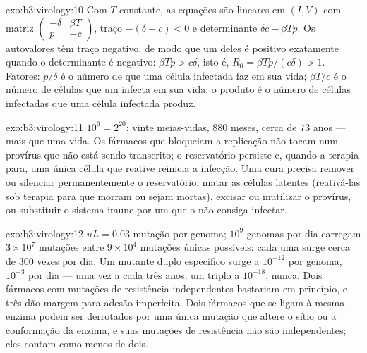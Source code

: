 \begin{solution}{exo:b3:virology:10}
Com $T$ constante, as equações são lineares em $(I, V)$ com matriz
$\begin{pmatrix} -\delta & \beta T \\ p & -c \end{pmatrix}$, traço
$-(\delta + c) < 0$ e determinante $\delta c - \beta Tp$. Os autovalores
têm traço negativo, de modo que um deles é positivo exatamente quando o
determinante é negativo: $\beta Tp > c\delta$, isto é,
$R_{0} = \beta
Tp/(c\delta) > 1$. Fatores: $p/\delta$ é o número de
 que uma célula infectada faz em sua vida; $\beta T/c$ é o número
de células que um  infecta em sua vida; o produto é o número de
células infectadas que uma célula infectada produz.
\end{solution}

\begin{solution}{exo:b3:virology:11}
$10^{6} = 2^{20}$: vinte meias-vidas, $880$ meses, cerca de $73$ anos
--- mais que uma vida. Os fármacos que bloqueiam a replicação não tocam
num provírus que não está sendo transcrito; o reservatório persiste e,
quando a terapia para, uma única célula que reative reinicia a
infecção. Uma cura precisa remover ou silenciar permanentemente o
reservatório: matar as células latentes (reativá-las sob terapia para
que morram ou sejam mortas), excisar ou inutilizar o provírus, ou
substituir o sistema imune por um que o  não consiga infectar.
\end{solution}

\begin{solution}{exo:b3:virology:12}
$uL = 0.03$ mutação por genoma; $10^{9}$ genomas por dia carregam
$3\times
10^{7}$ mutações entre $9\times 10^{4}$ mutações únicas
possíveis: cada uma surge cerca de $300$ vezes por dia. Um mutante
duplo específico surge a $10^{-12}$ por genoma, $10^{-3}$ por dia ---
uma vez a cada três anos; um triplo a $10^{-18}$, nunca. Dois fármacos
com mutações de resistência independentes bastariam em princípio, e
três dão margem para adesão imperfeita. Dois fármacos que se ligam à
mesma enzima podem ser derrotados por uma única mutação que altere o
sítio ou a conformação da enzima, e suas mutações de resistência não
são independentes; eles contam como menos de dois.
\end{solution}

